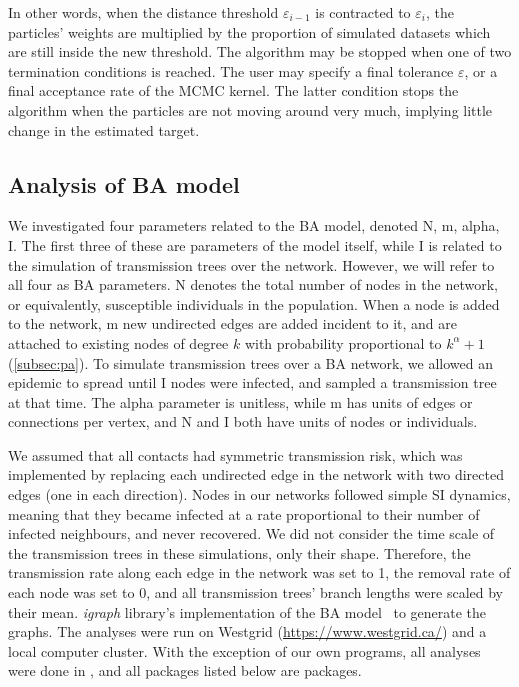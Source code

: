 In other words, when the distance threshold $\varepsilon_{i-1}$ is contracted
to $\varepsilon_i$, the particles' weights are multiplied by the proportion of
simulated datasets which are still inside the new threshold. The algorithm may
be stopped when one of two termination conditions is reached. The user may
specify a final tolerance $\varepsilon$, or a final acceptance rate of the
\gls{MCMC} kernel. The latter condition stops the algorithm when the particles
are not moving around very much, implying little change in the estimated
target.

\subsection{Analysis of \acrlong{BA} model}

We investigated four parameters related to the \gls{BA} model, denoted
\gls{N}, \gls{m}, \gls{alpha}, \gls{I}. The first three of these are parameters
of the model itself, while \gls{I} is related to the simulation of transmission
trees over the network. However, we will refer to all four as \gls{BA}
parameters. \gls{N} denotes the total number of nodes in the network, or
equivalently, susceptible individuals in the population. When a node is added
to the network, \gls{m} new undirected edges are added incident to it, and are
attached to existing nodes of degree $k$ with probability proportional to
$k^\alpha + 1$ (\cref{subsec:pa}). To simulate transmission trees over a
\gls{BA} network, we allowed an epidemic to spread until \gls{I} nodes were
infected, and sampled a transmission tree at that time. The \gls{alpha}
parameter is unitless, while \gls{m} has units of edges or connections per
vertex, and \gls{N} and \gls{I} both have units of nodes or individuals.

We assumed that all contacts had symmetric transmission risk, which was
implemented by replacing each undirected edge in the network with two directed
edges (one in each direction). Nodes in our networks followed simple \gls{SI}
dynamics, meaning that they became infected at a rate proportional to their
number of infected neighbours, and never recovered. We did not consider the
time scale of the transmission trees in these simulations, only their shape.
Therefore, the transmission rate along each edge in the network was set to 1,
the removal rate of each node was set to 0, and all transmission trees' branch
lengths were scaled by their mean. \textit{igraph} library's implementation of
the BA model~\autocite{csardi2006igraph} to generate the graphs. The analyses
were run on Westgrid (\url{https://www.westgrid.ca/}) and a local computer
cluster. With the exception of our own programs, all analyses were done in
, and all packages listed below are  packages.

